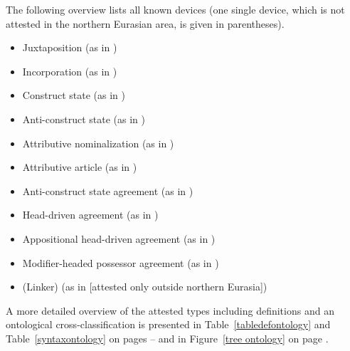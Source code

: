 The following overview lists all known devices (one single device, which is not attested in the northern Eurasian area, is given in parentheses).
\begin{itemize}
\item{Juxtaposition} (as in )
\item{Incorporation} (as in )
\item{Construct state} (as in )
\item{Anti\hyp{}construct state} (as in )
\item{Attributive nominalization} (as in )
\item{Attributive article} (as in )
\item{Anti\hyp{}construct state agreement} (as in )
\item{Head\hyp{}driven agreement} (as in )
\item{Appositional head\hyp{}driven agreement} (as in )
\item{Modifier\hyp{}headed possessor agreement} (as in )
\item{(Linker)} (as in  [attested only outside northern Eurasia])
\end{itemize}
A more detailed overview of the attested types including definitions and an ontological cross-classification is presented in Table~\ref{tabledefontology} and Table~\ref{syntaxontology} on pages \pageref{tabledefontology}–\pageref{syntaxontology} and in Figure~\ref{tree ontology} on page \pageref{tree ontology}.

